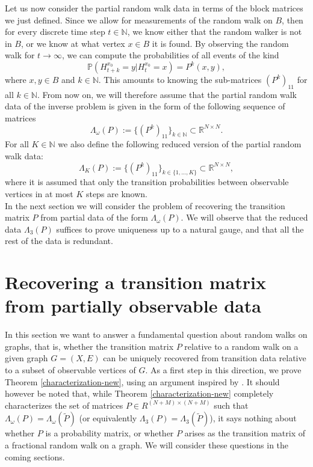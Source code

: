\documentclass[a4paper,11pt,oneside]{amsart}
\newcommand{\R}{{\mathbb R}}
\newcommand{\N}{{\mathbb N}}
\begin{document}
Let us now consider the partial random walk data in terms of the block matrices we just defined. 
Since we allow for measurements of the random walk on $B$, then for every discrete time step $t\in\N$, we know either that the random walker is not in $B$, or we know at what vertex $x\in B$ it is found. By observing the random walk for $t\rightarrow\infty$, we can compute the probabilities of all events of the kind
$$\mathbb P(H^{x_0}_{t+k}=y|H^{x_0}_t=x)=P^k(x,y),$$ where $x,y\in B$ and $k\in\N$. This amounts to knowing the sub-matrices $(P^k)_{11}$ for all $k\in\N$. From now on, we will therefore assume that the partial random walk data of the inverse problem is given in the form of the following sequence of matrices 
$$ \Lambda_{\omega}(P):=\{ (P^k)_{11} \}_{k\in\N} \subset \R^{N\times N}. $$
For all $K\in\N$ we also define the following reduced version of the partial random walk data:
$$ \Lambda_{K}(P):=\{ (P^k)_{11} \}_{k\in\{1,...,K\}} \subset \R^{N\times N}, $$
where it is assumed that only the transition probabilities between observable vertices in at most $K$ steps are known. \\

In the next section we will consider the problem of recovering the transition matrix $P$ from partial data of the form $\Lambda_{\omega}(P)$. We will observe that the reduced data $\Lambda_{3}(P)$ suffices to prove uniqueness up to a natural gauge, and that all the rest of the data is redundant.

\section{Recovering a transition matrix from partially observable data}\label{sec:data-char}

In this section we want to answer a fundamental question about random walks on graphs, that is, whether the transition matrix $P$ relative to a random walk on a given graph $G=(X,E)$ can be uniquely recovered from transition data relative to a subset of observable vertices of $G$. As a first step in this direction, we prove Theorem \ref{characterization-new}, using an argument inspired by \cite[Theorem 2]{PO99}. It should however be noted that, while Theorem \ref{characterization-new} completely characterizes the set of matrices $P \in R^{(N+M)\times (N+M)}$ such that $\Lambda_{\omega}(P) = \Lambda_{\omega}(\tilde P)$ (or equivalently $\Lambda_{3}(P) = \Lambda_{3}(\tilde P)$), it says nothing about whether $P$ is a probability matrix, or whether $P$ arises as the transition matrix of a fractional random walk on a graph. We will consider these questions in the coming sections.
\end{document}
